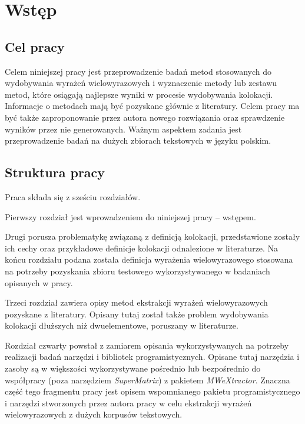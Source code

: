 
\chapter{Wstęp}

\section{Cel pracy}
Celem niniejszej pracy jest przeprowadzenie badań metod stosowanych do wydobywania wyrażeń wielowyrazowych i wyznaczenie metody lub zestawu metod, które osiągają najlepsze wyniki w procesie wydobywania kolokacji.
Informacje o metodach mają być pozyskane głównie z literatury.
Celem pracy ma być także zaproponowanie przez autora nowego rozwiązania oraz sprawdzenie wyników przez nie generowanych.
Ważnym aspektem zadania jest przeprowadzenie badań na dużych zbiorach tekstowych w języku polskim.


\section{Struktura pracy}
Praca składa się z sześciu rozdziałów.

\par
Pierwszy rozdział jest wprowadzeniem do niniejszej pracy -- wstępem.

\par
Drugi porusza problematykę związaną z definicją kolokacji, przedstawione zostały ich cechy oraz przykładowe definicje kolokacji odnalezione w literaturze.
Na końcu rozdziału podana została definicja wyrażenia wielowyrazowego stosowana na potrzeby pozyskania zbioru testowego wykorzystywanego w badaniach opisanych w pracy.

\par
Trzeci rozdział zawiera opisy metod ekstrakcji wyrażeń wielowyrazowych pozyskane z literatury.
Opisany tutaj został także problem wydobywania kolokacji dłuższych niż dwuelementowe, poruszany w literaturze.

\par
Rozdział czwarty powstał z zamiarem opisania wykorzystywanych na potrzeby realizacji badań narzędzi i bibliotek programistycznych.
Opisane tutaj narzędzia i zasoby są w większości wykorzystywane pośrednio lub bezpośrednio do współpracy (poza narzędziem \emph{SuperMatrix}) z pakietem \emph{MWeXtractor}.
Znaczna część tego fragmentu pracy jest opisem wspomnianego pakietu programistycznego i narzędzi stworzonych przez autora pracy w celu ekstrakcji wyrażeń wielowyrazowych z dużych korpusów tekstowych.

